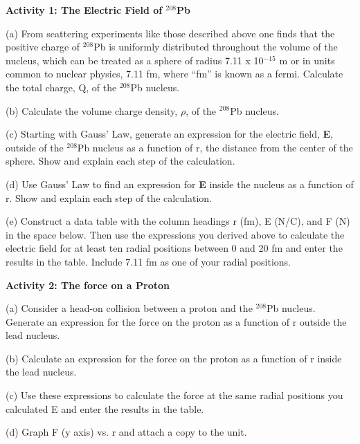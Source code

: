 \textbf{Activity 1: The Electric Field of \( ^{208} \)Pb}

(a) From scattering experiments like those described above one finds
that the positive charge of \( ^{208} \)Pb is uniformly distributed
throughout the volume of the nucleus, which can be treated as a sphere
of radius 7.11 x 10\( ^{-15} \) m or in units common to nuclear physics,
7.11 fm, where {}``fm'' is known as a fermi. Calculate the total
charge, Q, of the \( ^{208} \)Pb nucleus.
\vspace{30mm}

(b) Calculate the volume charge density, \( \rho  \), of the \( ^{208} \)Pb
nucleus.
\vspace{30mm}

(c) Starting with Gauss' Law, generate an expression for the electric
field, \textbf{E}, outside of the \( ^{208} \)Pb nucleus as a function
of r, the distance from the center of the sphere. Show and explain
each step of the calculation.
\vspace{2in}

(d) Use Gauss' Law to find an expression for \textbf{E} inside the
nucleus as a function of r. Show and explain each step of the calculation.
\vspace{2in}

(e) Construct a data table with the column headings r (fm), E (N/C),
and F (N) in the space below. Then use the expressions you derived
above to calculate the electric field for at least ten radial positions
between 0 and 20 fm and enter the results in the table. Include 7.11
fm as one of your radial positions.
\vspace{3in}

\textbf{Activity 2: The force on a Proton}

(a) Consider a head-on collision between a proton and the \( ^{208} \)Pb
nucleus. Generate an expression for the force on the proton as a function
of r outside the lead nucleus.
\vspace{20mm}

\vspace{1in}
(b) Calculate an expression for the force on the proton as a function
of r inside the lead nucleus.
\vspace{30mm}

(c) Use these expressions to calculate the force at the same radial
positions you calculated E and enter the results in the table.

(d) Graph F (y axis) vs. r and attach a copy to the unit.
\vspace{10mm}

